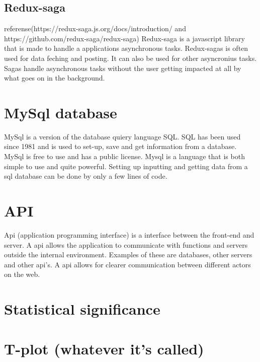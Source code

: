 \subsection{Redux-saga}
referense(https://redux-saga.js.org/docs/introduction/ and https://github.com/redux-saga/redux-saga) Redux-saga is a javascript library that is made to handle a applications asynchronous tasks. Redux-sagas is often used for data feching and posting. It can also be used for other asyncronius tasks. Sagas handle asynchronous tasks without the user getting impacted at all by what goes on in the background.


\section{MySql database}
MySql is a version of the database quiery language SQL. SQL has been used since 1981 and is used to set-up, save and get information from a database. MySql is free to use and has a public license. Mysql is a language that is both simple to use and quite powerful. Setting up inputting and getting data from a sql database can be done by only a few lines of code.

\section{API}
Api (application programming interface) is a interface between the front-end and server. A api allows the application to communicate with functions and servers outside the internal environment. Examples of these are databases, other servers and other api's. A api allows for clearer communication between different actors on the web. 

\section{Statistical significance}

\section{T-plot (whatever it's called)}


